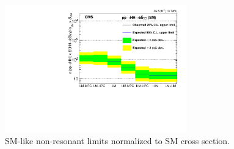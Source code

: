 \begin{figure}[h]
  \centering
  \includegraphics[width=0.7\textwidth]{figures/sec-results/NonResSMCats_SM.pdf}\hfil
  \caption{SM-like non-resonant limits normalized to SM cross section.}
  \label{fig:nonres_norm}
\end{figure}
